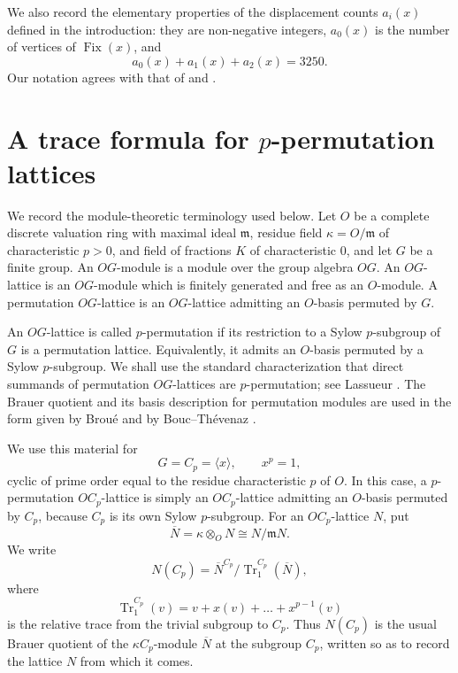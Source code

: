 \documentclass[11pt]{article}
\theoremstyle{plain}
\theoremstyle{remark}
\newcommand{\Fix}{\operatorname{Fix}}
\newcommand{\Tr}{\operatorname{Tr}}
\begin{document}
We also record the elementary properties of the displacement counts $a_i(x)$ defined in the introduction: they are non-negative integers,
$a_0(x)$ is the number of vertices of $\Fix(x)$, and
\[
 a_0(x)+a_1(x)+a_2(x)=3250.
\]
Our notation agrees with that of \cite{MacajSiran} and \cite{Kovacikova}.

\section{\texorpdfstring{A trace formula for $p$-permutation lattices}{A trace formula for p-permutation lattices}}\label{sec:padic}

We record the module-theoretic terminology used below.
Let $O$ be a complete discrete valuation ring with maximal ideal $\mathfrak m$,
residue field $\kappa=O/\mathfrak m$ of characteristic $p>0$, and field of fractions $K$ of characteristic $0$,
and let $G$ be a finite group.
An $OG$-module is a module over the group algebra $OG$.
An $OG$-lattice is an $OG$-module which is finitely generated and free as an $O$-module.
A permutation $OG$-lattice is an $OG$-lattice admitting an $O$-basis permuted by $G$.

An $OG$-lattice is called $p$-permutation if its restriction to a Sylow $p$-subgroup of $G$ is a permutation lattice.
Equivalently, it admits an $O$-basis permuted by a Sylow $p$-subgroup.
We shall use the standard characterization that direct summands of permutation $OG$-lattices are $p$-permutation;
see Lassueur \cite[Proposition--Definition 4.2]{Lassueur}.
The Brauer quotient and its basis description for permutation modules are used in the form given by Brou\'e and by Bouc--Th\'evenaz \cite{Broue,BoucThevenaz}.

We use this material for
\[
 G=C_p=\langle x\rangle,\qquad x^p=1,
\]
cyclic of prime order equal to the residue characteristic $p$ of $O$.
In this case, a $p$-permutation $OC_p$-lattice is simply an $OC_p$-lattice admitting an $O$-basis permuted by $C_p$,
because $C_p$ is its own Sylow $p$-subgroup.
For an $OC_p$-lattice $N$, put
\[
 \overline N=\kappa\otimes_{O}N\cong N/\mathfrak mN.
\]
We write
\begin{equation}\label{eq:brauer-quotient}
 N(C_p)=\overline N^{C_p}\big/\Tr_1^{C_p}(\overline N),
\end{equation}
where
\[
 \Tr_1^{C_p}(v)=v+x(v)+\dots+x^{p-1}(v)
\]
is the relative trace from the trivial subgroup to $C_p$.
Thus $N(C_p)$ is the usual Brauer quotient of the $\kappa C_p$-module $\overline N$ at the subgroup $C_p$,
written so as to record the lattice $N$ from which it comes.
\end{document}
